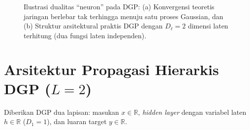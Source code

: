 \documentclass[11pt,a4paper]{article}
\begin{document}
\begin{figure}[htbp]
{\begin{tikzpicture}
\end{tikzpicture}
}
\vspace{-0.2cm}
\caption{Ilustrasi dualitas ``neuron'' pada DGP: (a) Konvergensi teoretis jaringan berlebar tak terhingga menuju satu proses Gaussian, dan (b) Struktur arsitektural praktis DGP dengan $D_\ell = 2$ dimensi laten terhitung (dua fungsi laten independen).}
\label{fig:neuron_dgp}
\end{figure}

\section{Arsitektur Propagasi Hierarkis DGP (\texorpdfstring{$L = 2$}{L = 2})}
\label{sec:arsitektur_dgp}

\noindent Diberikan DGP dua lapisan: masukan $x \in \mathbb{R}$, \textit{hidden layer} dengan variabel laten $h \in \mathbb{R}$ ($D_1 = 1$), dan luaran target $y \in \mathbb{R}$.
\end{document}
